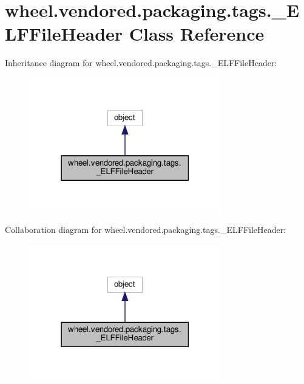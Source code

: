 \hypertarget{classwheel_1_1vendored_1_1packaging_1_1tags_1_1__ELFFileHeader}{}\section{wheel.\+vendored.\+packaging.\+tags.\+\_\+\+E\+L\+F\+File\+Header Class Reference}
\label{classwheel_1_1vendored_1_1packaging_1_1tags_1_1__ELFFileHeader}


Inheritance diagram for wheel.\+vendored.\+packaging.\+tags.\+\_\+\+E\+L\+F\+File\+Header\+:
\nopagebreak
\begin{figure}[H]
\begin{center}
\leavevmode
\includegraphics[width=237pt]{classwheel_1_1vendored_1_1packaging_1_1tags_1_1__ELFFileHeader__inherit__graph}
\end{center}
\end{figure}


Collaboration diagram for wheel.\+vendored.\+packaging.\+tags.\+\_\+\+E\+L\+F\+File\+Header\+:
\nopagebreak
\begin{figure}[H]
\begin{center}
\leavevmode
\includegraphics[width=237pt]{classwheel_1_1vendored_1_1packaging_1_1tags_1_1__ELFFileHeader__coll__graph}
\end{center}
\end{figure}
